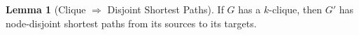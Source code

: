 \documentclass[11pt]{article}
\DeclareMathOperator{\pos}{pos}
\theoremstyle{definition}
\newtheorem{lemma}[theorem]{Lemma}
\newtheorem{claim}[theorem]{Claim}
\begin{document}

        


    \begin{lemma}[Clique $\Rightarrow$ Disjoint Shortest Paths]
    \label{lem:clique-to-dsp}
        If $G$ has a $k$-clique, then $G'$ has node-disjoint shortest paths from its sources to its targets.
    \end{lemma}
\end{document}
